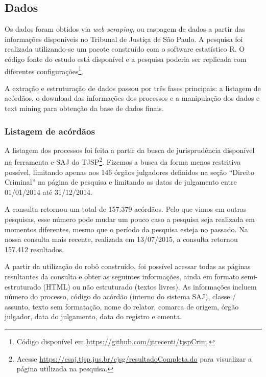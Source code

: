 \documentclass[10pt,]{article}
\let\rmarkdownfootnote\footnote%
\def\footnote{\protect\rmarkdownfootnote}
\begin{document}
\subsection{Dados}\label{dados}

Os dados foram obtidos via \emph{web scraping}, ou raspagem de dados a
partir das informações disponíveis no Tribunal de Justiça de São Paulo.
A pesquisa foi realizada utilizando-se um pacote construído com o
software estatístico R. O código fonte do estudo está disponível e a
pesquisa poderia ser replicada com diferentes configurações\footnote{Código
  disponível em
  \href{https://github.com/jtrecenti/tjspCrim}{\url{https://github.com/jtrecenti/tjspCrim}}.}.

A extração e estruturação de dados passou por três fases principais: a
listagem de acórdãos, o download das informações dos processos e a
manipulação dos dados e text mining para obtenção da base de dados
finais.

\subsubsection{Listagem de acórdãos}\label{listagem-de-acordaos}

A listagem dos processos foi feita a partir da busca de jurisprudência
disponível na ferramenta e-SAJ do TJSP\footnote{Acesse
  \href{https://esaj.tjsp.jus.br/cjsg/resultadoCompleta.do}{\url{https://esaj.tjsp.jus.br/cjsg/resultadoCompleta.do}}
  para visualizar a página utilizada na pesquisa.}. Fizemos a busca da
forma menos restritiva possível, limitando apenas aos 146 órgãos
julgadores definidos na seção ``Direito Criminal'' na página de pesquisa
e limitando as datas de julgamento entre 01/01/2014 até 31/12/2014.

A consulta retornou um total de 157.379 acórdãos. Pelo que vimos em
outras pesquisas, esse número pode mudar um pouco caso a pesquisa seja
realizada em momentos diferentes, mesmo que o período da pesquisa esteja
no passado. Na nossa consulta mais recente, realizada em 13/07/2015, a
consulta retornou 157.412 resultados.

A partir da utilização do robô construído, foi possível acessar todas as
páginas resultantes da consulta e obter as seguintes informações, ainda
em formato semi-estruturado (HTML) ou não estruturado (textos livres).
As informações incluem número do processo, código do acórdão (interno do
sistema SAJ), classe / assunto, texto sem formatação, nome do relator,
comarca de origem, órgão julgador, data do julgamento, data do registro
e ementa.
\end{document}
